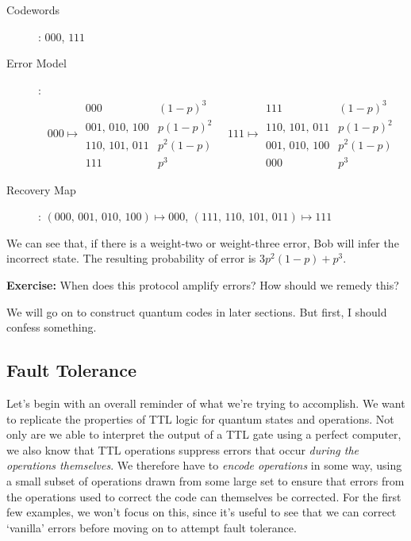 \documentclass[10pt,a4paper, english]{scrartcl}
\begin{document}
\begin{description}
\item[Codewords]: $000$, $111$
\item[Error Model]:
\begin{equation}
000 \mapsto \begin{array}{cl}
000 & (1-p)^3 \\ 001,\, 010,\, 100 & p(1-p)^2 \\ 110,\, 101,\, 011 & p^2(1-p) \\ 111 & p^3
\end{array} \quad 
111 \mapsto \begin{array}{cl}
111 & (1-p)^3 \\ 110,\, 101,\, 011 & p(1-p)^2 \\ 001,\, 010,\, 100 & p^2(1-p) \\ 000 & p^3
\end{array}
\end{equation} 
\item[Recovery Map]: $(000,\,001,\,010,\,100) \mapsto 000$, $(111,\,110,\,101,\,011) \mapsto 111$
\end{description}
We can see that, if there is a weight-two or weight-three error, Bob will infer the incorrect state.
The resulting probability of error is $3p^2(1-p) + p^3$. 

\textbf{Exercise: } When does this protocol amplify errors? How should we remedy this?

We will go on to construct quantum codes in later sections. 
But first, I should confess something.
\subsection{Fault Tolerance}
Let's begin with an overall reminder of what we're trying to accomplish.
We want to replicate the properties of TTL logic for quantum states and operations.
Not only are we able to interpret the output of a TTL gate using a perfect computer, we also know that TTL operations suppress errors that occur \emph{during the operations themselves}. 
We therefore have to \emph{encode operations} in some way, using a small subset of operations drawn from some large set to ensure that errors from the operations used to correct the code can themselves be corrected. 
For the first few examples, we won't focus on this, since it's useful to see that we can correct `vanilla' errors before moving on to attempt fault tolerance.
\end{document}
